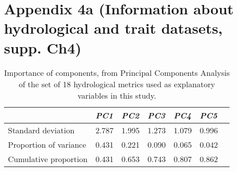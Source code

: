 \chapter[Appendix 4a (Information about hydrological and trait datasets, supp. Ch4)]{Appendix 4a (Information about hydrological and trait datasets, supp. Ch4)}

\begin{table}[ht]
\tiny
\centering
\caption[PCA of hydrological variables]{Importance of components, from Principal Components Analysis of the set of 18 hydrological metrics used as explanatory variables in this study.}
\label{Ch4sup_T1}
\begin{tabu} to 
\hline
                       &  \textit{PC1}   & \textit{PC2}   & \textit{PC3}   & \textit{PC4}   & \textit{PC5}  \\ \hline
Standard deviation     & 2.787 & 1.995 & 1.273 & 1.079 & 0.996 \\
Proportion of variance & 0.431 & 0.221 & 0.090 & 0.065 & 0.042 \\
Cumulative proportion  & 0.431 & 0.653 & 0.743 & 0.807 & 0.862 \\ \hline
\end{tabu}
\end{table}

